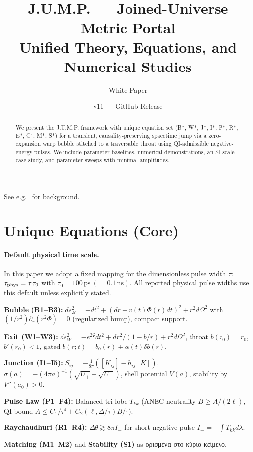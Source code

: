 \documentclass[11pt]{article}
\title{\textbf{J.U.M.P. --- Joined-Universe Metric Portal}\\
{\large Unified Theory, Equations, and Numerical Studies}}
\author{White Paper}
\date{v11 --- GitHub Release}
\newcommand{\taudef}{100\,\mathrm{ps}} %
\newcommand{\taudefns}{0.1\,\mathrm{ns}} %
\begin{document}
\maketitle
\begin{abstract}
We present the J.U.M.P. framework with unique equation set (B*, W*, J*, I*, P*, R*, E*, C*, M*, S*) for a transient, causality-preserving spacetime jump via a zero-expansion warp bubble stitched to a traversable throat using QI-admissible negative-energy pulses. We include parameter baselines, numerical demonstrations, an SI-scale case study, and parameter sweeps with minimal amplitudes.
\end{abstract}

See e.g.~\cite{Alcubierre1994,Natario2002,MorrisThorne1988,GaoJafferisWall2017,FordRoman1995} for background.

\section{Unique Equations (Core)}
\paragraph{Default physical time scale.} In this paper we adopt a fixed mapping for the dimensionless pulse width $\tau$: $\tau_{\rm phys}=\tau\,\tau_0$ with $\tau_0=\taudef\ (= \taudefns).$ All reported physical pulse widths use this default unless explicitly stated.

\textbf{Bubble (B1--B3):}
$ds_B^2 = -dt^2 + (dr - v(t)\Phi(r)dt)^2 + r^2 d\Omega^2$ with $(1/r^2)\partial_r(r^2\Phi)=0$ (regularized bump), compact support.
\medskip

\noindent\textbf{Exit (W1--W3):}
$ds_W^2 = -e^{2\Psi} dt^2 + dr^2/(1-b/r) + r^2 d\Omega^2$, throat $b(r_0)=r_0$, $b'(r_0)<1$, gated $b(r;t)=b_0(r)+\alpha(t)\delta b(r)$.
\medskip

\noindent\textbf{Junction (I1--I5):}
$S_{ij}=-\tfrac{1}{8\pi}([K_{ij}]-h_{ij}[K])$, $\sigma(a)= -(4\pi a)^{-1}(\sqrt{U_+}-\sqrt{U_-})$, shell potential $V(a)$, stability by $V''(a_0)>0$.
\medskip

\noindent\textbf{Pulse Law (P1--P4):}
Balanced tri-lobe $T_{kk}$ (ANEC-neutrality $B\ge A/(2\ell)$, QI-bound $A \le C_1/\tau^4 + C_2(\ell,\Delta/\tau)B/\tau$).
\medskip

\noindent\textbf{Raychaudhuri (R1--R4):}
$\Delta\theta \gtrsim 8\pi I_-$ for short negative pulse $I_-=-\int T_{kk}d\lambda$.
\medskip

\noindent\textbf{Matching (M1--M2)} and \textbf{Stability (S1)} as ορισμένα στο κύριο κείμενο.
\end{document}
